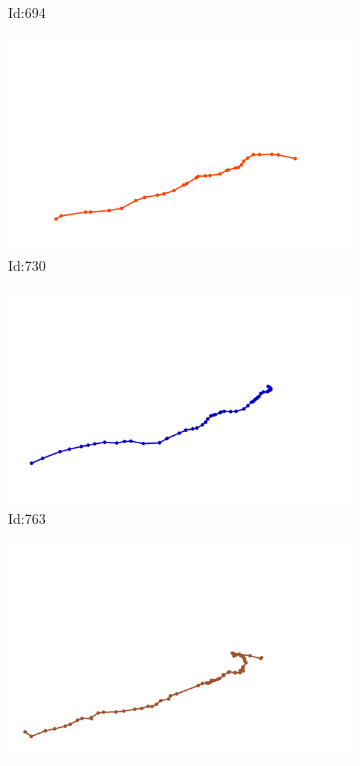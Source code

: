\documentclass[12pt,twoside]{report}
\begin{document}
\begin{figure}
\begin{subfigure}[b]{0.20\textwidth}
\caption{Id:694}
\end{subfigure}
\begin{subfigure}[b]{0.20\textwidth}
\centering
\includegraphics[width=\textwidth]{../trajectories/730.png}
\caption{Id:730}
\end{subfigure}
\begin{subfigure}[b]{0.20\textwidth}
\centering
\includegraphics[width=\textwidth]{../trajectories/763.png}
\caption{Id:763}
\end{subfigure}
\begin{subfigure}[b]{0.20\textwidth}
\centering
\includegraphics[width=\textwidth]{../trajectories/782.png}

\end{subfigure}
\end{figure}
\end{document}
